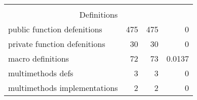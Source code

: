 \begin{table}[]
\begin{tabular}{lrrr}
                                                   & \multicolumn{1}{l}{}         & \multicolumn{1}{l}{}       & \multicolumn{1}{l}{}          \\
\multicolumn{4}{c}{Definitions}                                                                                                                \\ \hline
\multicolumn{1}{|l|}{public function defenitions}  & \multicolumn{1}{r|}{475}     & \multicolumn{1}{r|}{475}   & \multicolumn{1}{r|}{0}        \\ \hline
\multicolumn{1}{|l|}{private function defenitions} & \multicolumn{1}{r|}{30}      & \multicolumn{1}{r|}{30}    & \multicolumn{1}{r|}{0}        \\ \hline
\multicolumn{1}{|l|}{macro definitions}            & \multicolumn{1}{r|}{72}      & \multicolumn{1}{r|}{73}    & \multicolumn{1}{r|}{0.0137}   \\ \hline
\multicolumn{1}{|l|}{multimethods defs}            & \multicolumn{1}{r|}{3}       & \multicolumn{1}{r|}{3}     & \multicolumn{1}{r|}{0}        \\ \hline
\multicolumn{1}{|l|}{multimethods implementations} & \multicolumn{1}{r|}{2}       & \multicolumn{1}{r|}{2}     & \multicolumn{1}{r|}{0}        \\ \hline
\end{tabular}
\end{table}